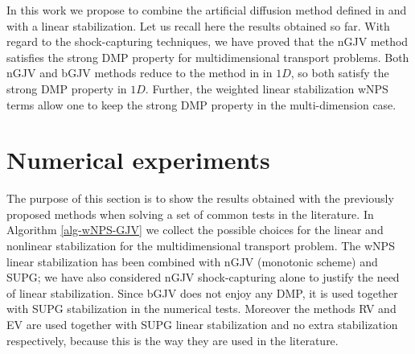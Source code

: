 In this work we propose to combine the artificial diffusion method defined in  and  with a linear stabilization. Let us recall here the results obtained so far. With regard to the shock-capturing techniques, we have proved that the nGJV method satisfies the strong DMP property for multidimensional transport problems. Both nGJV and bGJV methods reduce to the method in \cite{burman_nonlinear_2007} in $1D$, so both satisfy the strong DMP property in $1D$. Further, the weighted linear stabilization wNPS terms allow one to keep the strong DMP property in the multi-dimension case. %



\section{Numerical experiments}\label{s-numex}
%
The purpose of this section is to show the results obtained with the previously proposed methods when solving a set of common tests in the literature. In Algorithm \ref{alg-wNPS-GJV}  we collect the possible choices for the linear and nonlinear stabilization for the multidimensional transport problem. The wNPS linear stabilization has been combined with nGJV (monotonic scheme) and SUPG; we have also considered nGJV shock-capturing alone to justify the need of linear stabilization. Since bGJV does not enjoy any DMP, it is used together with SUPG stabilization in the numerical tests. Moreover the methods RV and EV are used together with SUPG linear stabilization and no extra stabilization respectively, because this is the way they are used in the literature. 


